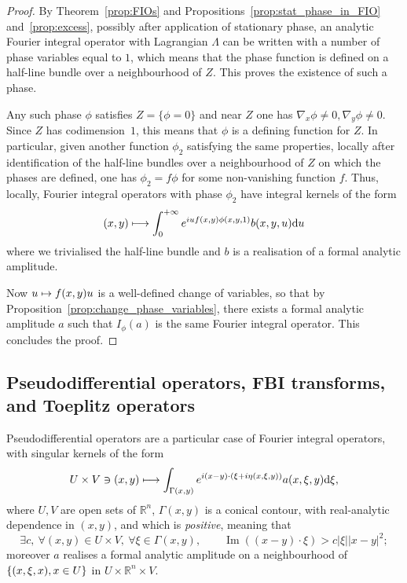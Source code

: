 \documentclass[10pt]{amsart}
\theoremstyle{definition}\newtheorem{defi}[theo]{Definition}\newtheorem{rema}[theo]{Remark}\newtheorem{exam}[theo]{Example}\newtheorem{exem}[theo]{Example}\newtheorem{nota}[theo]{Notation}
\DeclareMathOperator{\im}{Im}
\newcommand\1{\mathds{1}}
\newcommand{\R}{\mathbb{R}}
\newcommand{\dd}{\mathrm{d}}
\let\oldexists\exists
\renewcommand*{\exists}{\mathrel{\oldexists}}
\let\oldforall\forall
\renewcommand*{\forall}{\mathrel{\oldforall}}
\let\oldmapsto\mapsto
\renewcommand*{\mapsto}{\mathchoice{\longmapsto}{\oldmapsto}{\oldmapsto}{\oldmapsto}}
\begin{document}
\begin{proof}
By Theorem~\ref{prop:FIOs} and Propositions~\ref{prop:stat_phase_in_FIO} and~\ref{prop:excess}, possibly after application of stationary phase, an analytic Fourier integral operator with Lagrangian $\Lambda$ can be written with a number of phase variables equal to $1$, which means that the phase function is defined on a half-line bundle over a neighbourhood of $Z$. This proves the existence of such a phase.

Any such phase $\phi$ satisfies $Z=\{\phi=0\}$ and near $Z$ one has $\nabla_x\phi\neq 0,\nabla_y\phi\neq 0$. Since $Z$ has codimension~$1$, this means that $\phi$ is a defining function for $Z$. In particular, given another function $\phi_2$ satisfying the same properties, locally after identification of the half-line bundles over a neighbourhood of $Z$ on which the phases are defined, one has $\phi_2=f\phi$ for some non-vanishing function $f$. Thus, locally, Fourier {integral operators} with phase $\phi_2$ have integral kernels of the form
\[
(x,y)\mapsto \int_0^{+\infty}e^{iuf(x,y)\phi(x,y,1)}b(x,y,u)\dd u
\]
where we trivialised the half-line bundle and $b$ is a realisation of a formal analytic amplitude.

Now $u\mapsto f(x,y)u$ is a well-defined change of variables, so that by Proposition~\ref{prop:change_phase_variables}, there exists a formal analytic amplitude $a$ such that $I_{\phi}(a)$ is the same Fourier integral operator. This concludes the proof.
\end{proof}

\subsection{Pseudodifferential operators, FBI transforms, and Toeplitz operators}\label{sec:pseud-oper-1}

Pseudodifferential operators are a particular case of Fourier integral operators, with singular kernels of the form
\begin{equation}\label{eq:kernel_pseudos}
U\times V\ni (x,y)\mapsto \int_{\Gamma(x,y)} e^{i(x-y)\cdot (\xi+i\eta(x,\xi,y))}a(x,\xi,y)\dd \xi,
\end{equation}
where $U,V$ are open sets of $\R^n$, $\Gamma(x,y)$ is a conical contour, with real-analytic dependence in $(x,y)$, and which is \emph{positive}, meaning that
\begin{equation}\label{eq:good_ctr_pseudo}
\exists c, \:\forall (x,y)\in U\times V,\: \forall \xi\in \Gamma(x,y),\qquad\im((x-y)\cdot \xi)>c|\xi||x-y|^2;
\end{equation}
moreover $a$ realises a formal analytic amplitude on a neighbourhood of $\{(x,\xi,x),\linebreak x\in U\}$ in $U\times \R^n\times V$.
\end{document}
